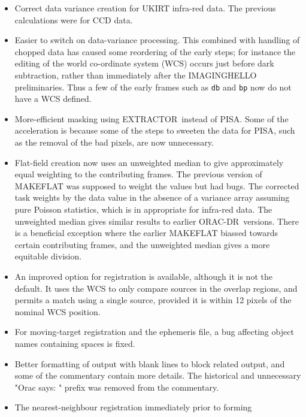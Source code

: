 \documentclass[twoside,11pt]{article}
\newcommand{\xref}[3]{#1}
\renewcommand{\_}{\texttt{\symbol{95}}}
\newcommand{\EXTRACTOR}{\mbox{\footnotesize EXTRACTOR}}
\newcommand{\ORACDR}{{\footnotesize ORAC-DR}}
\newcommand{\PISA}{{\footnotesize PISA}}
\begin{document}
\begin{itemize}
   \item Correct data variance creation for UKIRT infra-red data.  The
         previous calculations were for CCD data.
   \item Easier to switch on data-variance processing.  This combined
         with handling of chopped data has caused some reordering of
	 the early steps; for instance the editing of the world
	 co-ordinate system (WCS) occurs just before dark subtraction,
	 rather than immediately after the \_IMAGING\_HELLO\_
	 preliminaries.  Thus a few of the early frames such as
	 {\tt\_db} and {\tt\_bp} now do not have a WCS defined.
   \item More-efficient masking using \EXTRACTOR\ instead of \PISA.
         Some of the acceleration is because some of the steps to
	 sweeten the data for \PISA, such as the removal of the bad
	 pixels, are now unnecessary.
   \item Flat-field creation now uses an unweighted median to give 
         approximately equal weighting to the contributing frames. 
         The previous version of \xref{MAKEFLAT}{sun139}{MAKEFLAT} was
         supposed to weight the values but had bugs.  The corrected
         task weights by the data value in the absence of a variance
         array assuming pure Poisson statistics, which is in appropriate
         for infra-red data.  The unweighted median gives similar
         results to earlier \ORACDR\ versions.  There is a beneficial
         exception where the earlier MAKEFLAT biassed towards certain
         contributing frames, and the unweighted median gives a more
         equitable division.
   \item An improved option for registration is available, although it
         is not the default.  It uses the WCS to only compare sources
         in the overlap regions, and permits a match using a single source,
         provided it is within 12 pixels of the nominal WCS position. 
   \item For moving-target registration and the ephemeris file, a bug
         affecting object names containing spaces is fixed.
   \item Better formatting of output with blank lines to block related
         output, and some of the commentary contain more details.  The
         historical and unnecessary "Orac says: " prefix was removed
         from the commentary.
   \item The nearest-neighbour registration immediately prior to forming

\end{itemize}
\end{document}
